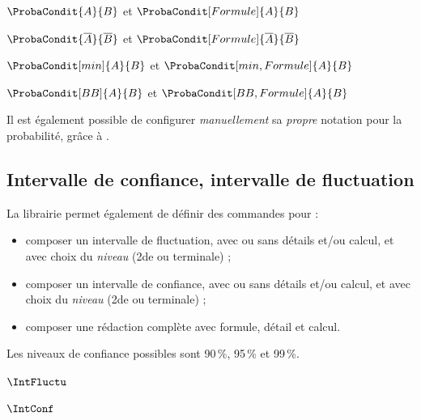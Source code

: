 \begin{PresCodeTexPL}{}
$\ProbaCondit{A}{B}$ et $\ProbaCondit[Formule]{A}{B}$

$\ProbaCondit{\overline{A}}{\overline{B}}$ et $\ProbaCondit[Formule]{\overline{A}}{\overline{B}}$

$\ProbaCondit[min]{A}{B}$ et $\ProbaCondit[min,Formule]{A}{B}$

$\ProbaCondit[BB]{A}{B}$ et $\ProbaCondit[BB,Formule]{A}{B}$
\end{PresCodeTexPL}

\begin{tipblock}
Il est également possible de configurer \textit{manuellement} sa \textit{propre} notation pour la probabilité, grâce à .
\end{tipblock}

\subsection{Intervalle de confiance, intervalle de fluctuation}\label{IFIC}

\begin{tipblock}
 La librairie  permet également de définir des commandes pour :

\begin{itemize}
	\item composer un intervalle de fluctuation, avec ou sans détails et/ou calcul, et avec choix du \textit{niveau} (2de ou terminale) ;
	\item composer un intervalle de confiance, avec ou sans détails et/ou calcul, et avec choix du \textit{niveau} (2de ou terminale) ;
	\item composer une rédaction complète avec formule, détail et calcul.
\end{itemize}

Les niveaux de confiance possibles sont 90\,\%, 95\,\% et 99\,\%.
\end{tipblock}

\begin{PresCodeTexPL}{}
$\IntFluctu$

$\IntConf$
\end{PresCodeTexPL}

